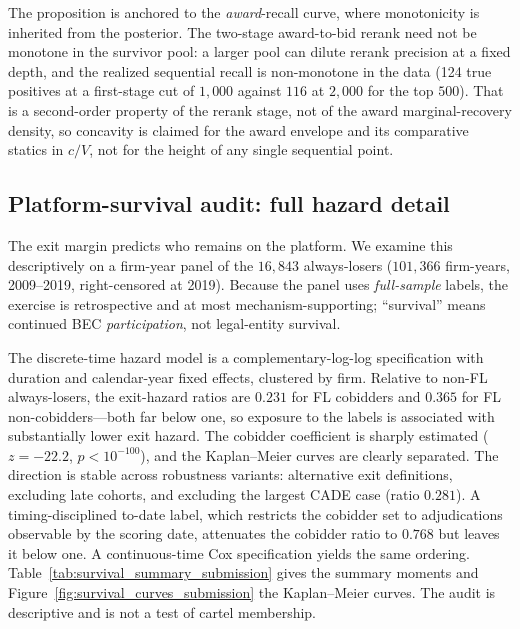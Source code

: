 The proposition is anchored to the \emph{award}-recall curve, where
monotonicity is inherited from the posterior. The two-stage
award-to-bid rerank need not be monotone in the survivor pool: a larger
pool can dilute rerank precision at a fixed depth, and the realized
sequential recall is non-monotone in the data (124 true positives at a
first-stage cut of $1{,}000$ against $116$ at $2{,}000$ for the top
$500$). That is a second-order property of the rerank stage, not of the
award marginal-recovery density, so concavity is claimed for the award
envelope and its comparative statics in $c/V$, not for the height of any
single sequential point.

\subsection{Platform-survival audit: full hazard detail}
\label{supp:theory_survival}

The exit margin predicts who remains on the platform. We examine this
descriptively on a firm-year panel of the $16{,}843$ always-losers
($101{,}366$ firm-years, 2009--2019, right-censored at 2019). Because
the panel uses \emph{full-sample} labels, the exercise is retrospective
and at most mechanism-supporting; ``survival'' means continued BEC
\emph{participation}, not legal-entity survival.

The discrete-time hazard model is a complementary-log-log specification
with duration and calendar-year fixed effects, clustered by firm. Relative
to non-FL always-losers, the exit-hazard ratios are $0.231$ for FL
cobidders and $0.365$ for FL non-cobidders---both far below one, so
exposure to the labels is associated with substantially lower exit
hazard. The cobidder coefficient is sharply estimated
($z=-22.2$, $p<10^{-100}$), and the Kaplan--Meier curves are clearly
separated. The direction is stable across robustness variants:
alternative exit definitions, excluding late cohorts, and excluding the
largest CADE case (ratio $0.281$). A timing-disciplined to-date label,
which restricts the cobidder set to adjudications observable by the
scoring date, attenuates the cobidder ratio to $0.768$ but leaves it
below one. A continuous-time Cox specification yields the same ordering.
Table~\ref{tab:survival_summary_submission} gives the summary moments and
Figure~\ref{fig:survival_curves_submission} the Kaplan--Meier curves. The
audit is descriptive and is not a test of cartel membership.

